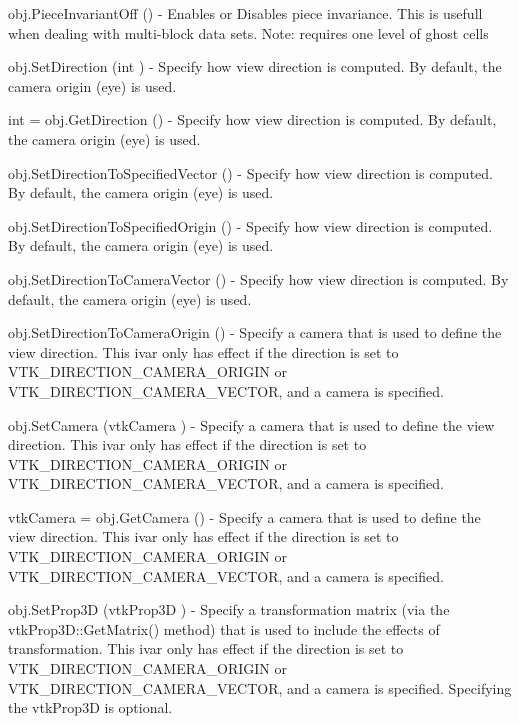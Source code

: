 \begin{DoxyItemize}
\item {\ttfamily obj.\-Piece\-Invariant\-Off ()} -\/ Enables or Disables piece invariance. This is usefull when dealing with multi-\/block data sets. Note\-: requires one level of ghost cells  
\item {\ttfamily obj.\-Set\-Direction (int )} -\/ Specify how view direction is computed. By default, the camera origin (eye) is used.  
\item {\ttfamily int = obj.\-Get\-Direction ()} -\/ Specify how view direction is computed. By default, the camera origin (eye) is used.  
\item {\ttfamily obj.\-Set\-Direction\-To\-Specified\-Vector ()} -\/ Specify how view direction is computed. By default, the camera origin (eye) is used.  
\item {\ttfamily obj.\-Set\-Direction\-To\-Specified\-Origin ()} -\/ Specify how view direction is computed. By default, the camera origin (eye) is used.  
\item {\ttfamily obj.\-Set\-Direction\-To\-Camera\-Vector ()} -\/ Specify how view direction is computed. By default, the camera origin (eye) is used.  
\item {\ttfamily obj.\-Set\-Direction\-To\-Camera\-Origin ()} -\/ Specify a camera that is used to define the view direction. This ivar only has effect if the direction is set to V\-T\-K\-\_\-\-D\-I\-R\-E\-C\-T\-I\-O\-N\-\_\-\-C\-A\-M\-E\-R\-A\-\_\-\-O\-R\-I\-G\-I\-N or V\-T\-K\-\_\-\-D\-I\-R\-E\-C\-T\-I\-O\-N\-\_\-\-C\-A\-M\-E\-R\-A\-\_\-\-V\-E\-C\-T\-O\-R, and a camera is specified.  
\item {\ttfamily obj.\-Set\-Camera (vtk\-Camera )} -\/ Specify a camera that is used to define the view direction. This ivar only has effect if the direction is set to V\-T\-K\-\_\-\-D\-I\-R\-E\-C\-T\-I\-O\-N\-\_\-\-C\-A\-M\-E\-R\-A\-\_\-\-O\-R\-I\-G\-I\-N or V\-T\-K\-\_\-\-D\-I\-R\-E\-C\-T\-I\-O\-N\-\_\-\-C\-A\-M\-E\-R\-A\-\_\-\-V\-E\-C\-T\-O\-R, and a camera is specified.  
\item {\ttfamily vtk\-Camera = obj.\-Get\-Camera ()} -\/ Specify a camera that is used to define the view direction. This ivar only has effect if the direction is set to V\-T\-K\-\_\-\-D\-I\-R\-E\-C\-T\-I\-O\-N\-\_\-\-C\-A\-M\-E\-R\-A\-\_\-\-O\-R\-I\-G\-I\-N or V\-T\-K\-\_\-\-D\-I\-R\-E\-C\-T\-I\-O\-N\-\_\-\-C\-A\-M\-E\-R\-A\-\_\-\-V\-E\-C\-T\-O\-R, and a camera is specified.  
\item {\ttfamily obj.\-Set\-Prop3\-D (vtk\-Prop3\-D )} -\/ Specify a transformation matrix (via the vtk\-Prop3\-D\-::\-Get\-Matrix() method) that is used to include the effects of transformation. This ivar only has effect if the direction is set to V\-T\-K\-\_\-\-D\-I\-R\-E\-C\-T\-I\-O\-N\-\_\-\-C\-A\-M\-E\-R\-A\-\_\-\-O\-R\-I\-G\-I\-N or V\-T\-K\-\_\-\-D\-I\-R\-E\-C\-T\-I\-O\-N\-\_\-\-C\-A\-M\-E\-R\-A\-\_\-\-V\-E\-C\-T\-O\-R, and a camera is specified. Specifying the vtk\-Prop3\-D is optional.  

\end{DoxyItemize}
